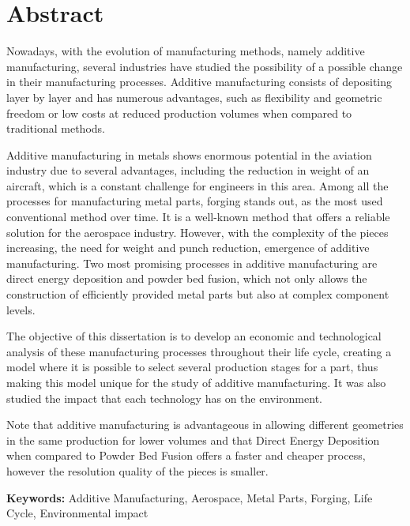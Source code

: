 
\section*{Abstract}

\vspace{50}
\hspace{10} Nowadays, with the evolution of manufacturing methods, namely additive manufacturing, several industries have studied the possibility of a possible change in their manufacturing processes. Additive manufacturing consists of depositing layer by layer and has numerous advantages, such as flexibility and geometric freedom or low costs at reduced production volumes when compared to traditional methods.\par
 Additive manufacturing in metals shows enormous potential in the aviation industry due to several advantages, including the reduction in weight of an aircraft, which is a constant challenge for engineers in this area. Among all the processes for manufacturing metal parts, forging stands out, as the most used conventional method over time. It is a well-known method that offers a reliable solution for the aerospace industry. However, with the complexity of the pieces increasing, the need for weight and punch reduction, emergence of additive manufacturing. Two most promising processes in additive manufacturing are direct energy deposition and powder bed fusion, which not only allows the construction of efficiently provided metal parts but also at complex component levels. \par
 The objective of this dissertation is to develop an economic and technological analysis of these manufacturing processes throughout their life cycle, creating a model where it is possible to select several production stages for a part, thus making this model unique for the study of additive manufacturing. It was also studied the impact that each technology has on the environment.\par
 Note that additive manufacturing is advantageous in allowing different geometries in the same production for lower volumes and that Direct Energy Deposition when compared to Powder Bed Fusion offers a faster and cheaper process, however the resolution quality of the pieces is smaller.

\vfill

\textbf{\Large Keywords:} Additive Manufacturing, Aerospace, Metal Parts, Forging, Life Cycle, Environmental impact

